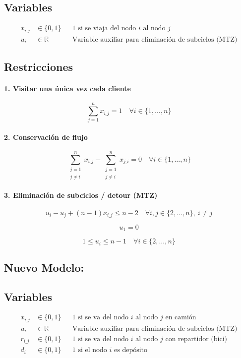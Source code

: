 \documentclass{article}
\begin{document}
    \subsection*{Variables}
    \begin{align*}
        x_{i\_j} &\in \{0,1\} && \text{1 si se viaja del nodo } i \text{ al nodo } j \\
        u_i &\in \mathbb{R} && \text{Variable auxiliar para eliminación de subciclos (MTZ)}
    \end{align*}

    \subsection*{Restricciones}

    \paragraph{1. Visitar una única vez cada cliente}
    \[
    \sum_{j=1}^{n} x_{i\_j} = 1 \quad \forall i \in \{1, \dots, n\}
    \]

    \paragraph{2. Conservación de flujo}
    \[
    \sum_{\substack{j=1 \\ j \ne i}}^{n} x_{i\_j} - \sum_{\substack{j=1 \\ j \ne i}}^{n} x_{j\_i} = 0 \quad \forall i \in \{1, \dots, n\}
    \]

    \paragraph{3. Eliminación de subciclos / detour (MTZ)}
    \[
    u_i - u_j + (n - 1)x_{i\_j} \leq n - 2 \quad \forall i, j \in \{2, \dots, n\},\ i \ne j
    \]

    \[
    u_1 = 0
    \]

    \[
    1 \leq u_i \leq n - 1 \quad \forall i \in \{2, \dots, n\}
    \]

    \subsection{Nuevo Modelo:} \label{model_repartidores}
    \subsection*{Variables}
    \begin{align*}
        x_{i\_j} &\in \{0,1\} && \text{1 si se va del nodo } i \text{ al nodo } j \text{ en camión }\\
        u_i &\in \mathbb{R} && \text{Variable auxiliar para eliminación de subciclos (MTZ)} \\
        r_{i\_j} &\in \{0,1\} && \text{1 si se va del nodo } i \text{ al nodo } j \text{ con repartidor (bici) } \\
        d_{i} &\in \{0,1\} && \text{1 si el nodo $i$ es depósito }
    \end{align*}
\end{document}
